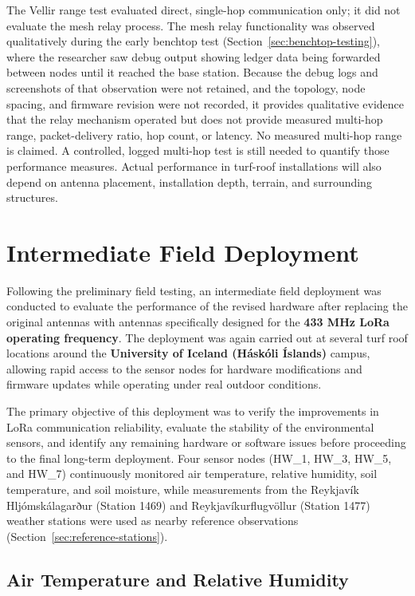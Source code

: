 The Vellir range test evaluated direct, single-hop communication only; it did not evaluate the mesh relay process. The mesh relay functionality was observed qualitatively during the early benchtop test (Section~\ref{sec:benchtop-testing}), where the researcher saw debug output showing ledger data being forwarded between nodes until it reached the base station. Because the debug logs and screenshots of that observation were not retained, and the topology, node spacing, and firmware revision were not recorded, it provides qualitative evidence that the relay mechanism operated but does not provide measured multi-hop range, packet-delivery ratio, hop count, or latency. No measured multi-hop range is claimed. A controlled, logged multi-hop test is still needed to quantify those performance measures. Actual performance in turf-roof installations will also depend on antenna placement, installation depth, terrain, and surrounding structures.

\section{Intermediate Field
Deployment}

Following the preliminary field testing, an intermediate field
deployment was conducted to evaluate the performance of the revised
hardware after replacing the original antennas with antennas
specifically designed for the \textbf{433 MHz LoRa operating frequency}.
The deployment was again carried out at several turf roof locations
around the \textbf{University of Iceland (Háskóli Íslands)} campus,
allowing rapid access to the sensor nodes for hardware modifications and
firmware updates while operating under real outdoor conditions.

The primary objective of this deployment was to verify the improvements
in LoRa communication reliability, evaluate the stability of the
environmental sensors, and identify any remaining hardware or software
issues before proceeding to the final long-term deployment. Four sensor
nodes (HW\_1, HW\_3, HW\_5, and HW\_7) continuously monitored air
temperature, relative humidity, soil temperature, and soil moisture,
while measurements from the Reykjavík Hljómskálagarður (Station 1469) and Reykjavíkurflugvöllur (Station 1477) weather stations were used as nearby reference observations (Section~\ref{sec:reference-stations}).

\subsection{Air Temperature and Relative
Humidity}

